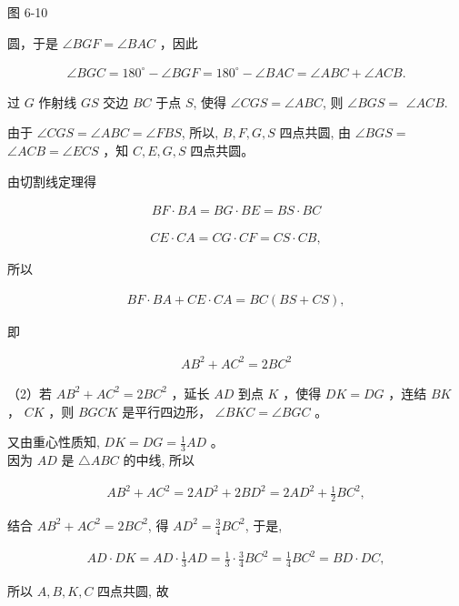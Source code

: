 \documentclass[10pt]{article}
\begin{document}
图 6-10

圆，于是 $\angle B G F=\angle B A C$ ，因此

\begin{align*}
\angle B G C=180^{\circ}-\angle B G F=180^{\circ}-\angle B A C=\angle A B C+\angle A C B .
\end{align*}

过 $G$ 作射线 $G S$ 交边 $B C$ 于点 $S$, 使得 $\angle C G S=\angle A B C$, 则 $\angle B G S=$ $\angle A C B$.

由于 $\angle C G S=\angle A B C=\angle F B S$, 所以, $B, F, G, S$ 四点共圆, 由 $\angle B G S=$ $\angle A C B=\angle E C S$ ，知 $C, E, G, S$ 四点共圆。

由切割线定理得

\begin{align*}
B F \cdot B A=B G \cdot B E=B S \cdot B C
\end{align*}

\begin{align*}
C E \cdot C A=C G \cdot C F=C S \cdot C B,
\end{align*}

所以

\begin{align*}
B F \cdot B A+C E \cdot C A=B C(B S+C S),
\end{align*}

即

\begin{align*}
A B^{2}+A C^{2}=2 B C^{2}
\end{align*}

（2）若 $A B^{2}+A C^{2}=2 B C^{2}$ ，延长 $A D$ 到点 $K$ ，使得 $D K=D G$ ，连结 $B K$ ， $C K$ ，则 $B G C K$ 是平行四边形， $\angle B K C=\angle B G C$ 。

又由重心性质知, $D K=D G=\frac{1}{3} A D$ 。\\
因为 $A D$ 是 $\triangle A B C$ 的中线, 所以

\begin{align*}
A B^{2}+A C^{2}=2 A D^{2}+2 B D^{2}=2 A D^{2}+\frac{1}{2} B C^{2},
\end{align*}

结合 $A B^{2}+A C^{2}=2 B C^{2}$, 得 $A D^{2}=\frac{3}{4} B C^{2}$, 于是,

\begin{align*}
A D \cdot D K=A D \cdot \frac{1}{3} A D=\frac{1}{3} \cdot \frac{3}{4} B C^{2}=\frac{1}{4} B C^{2}=B D \cdot D C,
\end{align*}

所以 $A, B, K, C$ 四点共圆, 故
\end{document}
